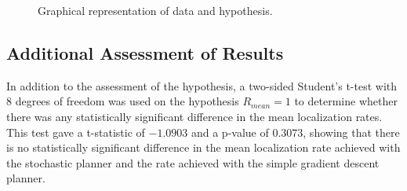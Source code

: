 \documentclass[submit]{aiaa-pretty-modified}
\begin{document}
\begin{figure}
\begin{center}
\caption{Graphical representation of data and hypothesis.}
\label{fig:killer}
\end{center}
\end{figure}


\subsection{Additional Assessment of Results}
\label{sec:additional}
In addition to the assessment of the hypothesis, a two-sided Student's
t-test with 8 degrees of freedom was used on the hypothesis $R_{mean}
= 1$ to determine whether there was any statistically significant
difference in the mean localization rates.  This test gave
a t-statistic of $-1.0903$ and a p-value of $0.3073$, showing that
there is no statistically significant difference in the mean localization
rate achieved with the stochastic planner and the rate achieved with
the simple gradient descent planner.
\end{document}

